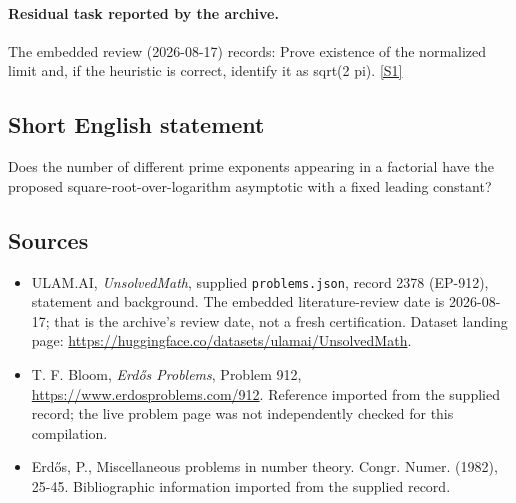 \documentclass[11pt,a4paper]{article}
\newcommand{\sref}[2]{\hyperlink{source:#1:#2}{[S#2]}}
\begin{document}
\paragraph{Residual task reported by the archive.}

The embedded review (2026-08-17) records: Prove existence of the normalized limit and, if the heuristic is correct, identify it as sqrt(2 pi). \sref{2378}{1}

\subsection{Short English statement}

Does the number of different prime exponents appearing in a factorial have the proposed square-root-over-logarithm asymptotic with a fixed leading constant?

\subsection{Sources}

{\small

\begin{itemize}

\item[\hypertarget{source:2378:1}{S1}] ULAM.AI, \emph{UnsolvedMath}, supplied \texttt{problems.json}, record 2378 (EP-912), statement and background. The embedded literature-review date is 2026-08-17; that is the archive’s review date, not a fresh certification. Dataset landing page: \url{https://huggingface.co/datasets/ulamai/UnsolvedMath}.

\item[\hypertarget{source:2378:2}{S2}] T. F. Bloom, \emph{Erdős Problems}, Problem 912, \url{https://www.erdosproblems.com/912}. Reference imported from the supplied record; the live problem page was not independently checked for this compilation.

\item[\hypertarget{source:2378:3}{S3}] Erd\H{o}s, P., Miscellaneous problems in number theory. Congr. Numer. (1982), 25-45. Bibliographic information imported from the supplied record.

\end{itemize}

}

\label{end:2378}
\end{document}

